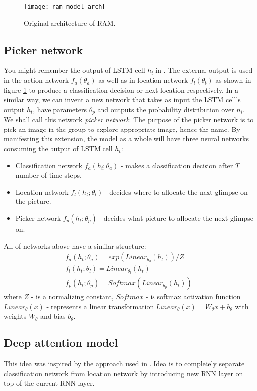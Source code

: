 {\begin{figure}[h!]
	\texttt{[image: ram\_model\_arch]}
	\caption{Original architecture of RAM.}
	\label{fig:ram_model_arch}
\end{figure}

\subsection{Picker network}
\label{subs:picker_net}
You might remember the output of LSTM cell $h_t$ in \cite{DBLP:journals/corr/MnihHGK14}.
The external output is used
in the action network $f_a(\theta_a)$ as well as in location network $f_l(\theta_b)$
as shown in figure \ref{fig:ram_model_arch} to produce a classification decision or
next location respectively. In a similar way, we can invent a new network that takes as
input the LSTM cell's output $h_t$, have parameters $\theta_p$ and outputs
the probability distribution over $n_i$. We shall call this network
\emph{picker network}. The purpose of the picker network is to pick an image
in the group to explore appropriate image, hence the name. By manifesting
this extension, the model as a whole will have three neural networks consuming
the output of LSTM cell $h_t$:
\begin{itemize}
	\item Classification network $f_a(h_t; \theta_a)$ - makes a classification
		decision after $T$ number of time steps.
	\item Location network $f_l(h_t; \theta_l)$ - decides where to allocate the next glimpse
	on the picture.
	\item Picker network $f_p(h_t; \theta_p)$ - decides what picture to allocate the next glimpse on.
\end{itemize}

All of networks above have a similar structure:
\begin{align} \label{eq:picker_network}
	f_a(h_t; \theta_a) = exp(Linear_{\theta_a}(h_t))/Z \\
	f_l(h_t; \theta_l) = Linear_{\theta_l}(h_t) \\
	f_p(h_t; \theta_p) = Softmax(Linear_{\theta_p}(h_t))
\end{align}
where $Z$ - is a normalizing constant, $Softmax$ - is softmax activation function
$Linear_{\theta}(x)$ - represents
a linear transformation $Linear_{\theta}(x) = W_{\theta}x+b_{\theta}$ with weights
$W_{\theta}$ and bias $b_{\theta}$.


\subsection{Deep attention model}
\label{subs:deep_att_model}
This idea was inspired by the approach used in \cite{DBLP:journals/corr/BaMK14}.
Idea is to completely separate classification network from location network
by introducing new RNN layer on top of the current RNN layer.

}
